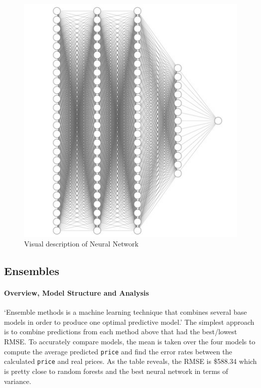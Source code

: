 \documentclass[
  paper=a4,
  ,captions=tableheading
]{scrartcl}
\begin{document}
\begin{figure}
\centering
\includegraphics{NN_res.jpeg}
\caption{Visual description of Neural Network}
\end{figure}

\hypertarget{ensembles}{%
\subsection{Ensembles}\label{ensembles}}

\hypertarget{overview-model-structure-and-analysis}{%
\paragraph{Overview, Model Structure and
Analysis}\label{overview-model-structure-and-analysis}}

`Ensemble methods is a machine learning technique that combines several
base models in order to produce one optimal predictive model.' The
simplest approach is to combine predictions from each method above that
had the best/lowest RMSE. To accurately compare models, the mean is
taken over the four models to compute the average predicted
\texttt{price} and find the error rates between the calculated
\texttt{price} and real prices. As the table reveals, the RMSE is
\$588.34 which is pretty close to random forests and the best neural
network in terms of variance.
\end{document}
